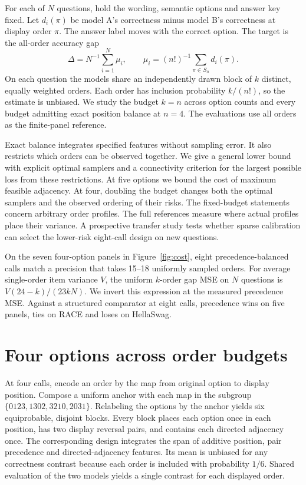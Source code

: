 \documentclass{article}
\begin{document}
For each of $N$ questions, hold the wording, semantic options and
answer key fixed. Let $d_i(\pi)$ be model A's correctness minus model
B's correctness at display order $\pi$. The answer label moves with
the correct option. The target is the all-order accuracy gap
\[
 \Delta=N^{-1}\sum_{i=1}^N\mu_i,\qquad
 \mu_i=(n!)^{-1}\sum_{\pi\in S_n}d_i(\pi).
\]
On each question the models share an independently drawn block of $k$
distinct, equally weighted orders. Each order has inclusion probability
$k/(n!)$, so the estimate is unbiased. We study the budget $k=n$ across
option counts and every budget admitting exact position balance at $n=4$.
The evaluations use all orders as the finite-panel reference.

Exact balance integrates specified features without sampling error.
It also restricts which orders can be observed together. We give a
general lower bound with explicit optimal samplers and a connectivity
criterion for the largest possible loss from these restrictions.
At five options we bound the cost of maximum feasible adjacency.
At four, doubling the budget changes both the optimal samplers and
the observed ordering of their risks. The fixed-budget statements concern arbitrary order
profiles. The full references measure where actual profiles place their
variance. A prospective transfer study tests whether sparse calibration
can select the lower-risk eight-call design on new questions.

On the seven four-option panels in Figure~\ref{fig:cost}, eight precedence-balanced calls match a precision that takes 15--18 uniformly sampled orders. For average single-order item variance $V$, the uniform $k$-order gap MSE on $N$ questions is $V(24-k)/(23kN)$. We invert this expression at the measured precedence MSE. Against a structured comparator at eight calls, precedence wins on five panels, ties on RACE and loses on HellaSwag.




\section{Four options across order budgets}
At four calls, encode an order by the map from original option to display position.
Compose a uniform anchor with each map in the subgroup
\(\{0123,1302,3210,2031\}\). Relabeling the options by the anchor yields six
equiprobable, disjoint blocks. Every block places each option once in each
position, has two display reversal pairs, and contains each directed
adjacency once. The corresponding design integrates the span of additive
position, pair precedence and directed-adjacency features. Its mean is
unbiased for any correctness contrast because each order is included
with probability \(1/6\). Shared evaluation of the two models yields a
single contrast for each displayed order.
\end{document}
